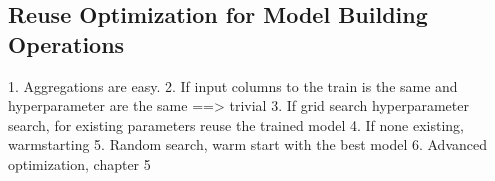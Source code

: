 \subsection{Reuse Optimization for Model Building Operations}
1. Aggregations are easy.
2. If input columns to the train is the same and hyperparameter are the same ==> trivial
3. If grid search hyperparameter search, for existing parameters reuse the trained model
4. If none existing, warmstarting
5. Random search, warm start with the best model
6. Advanced optimization, chapter 5

%
